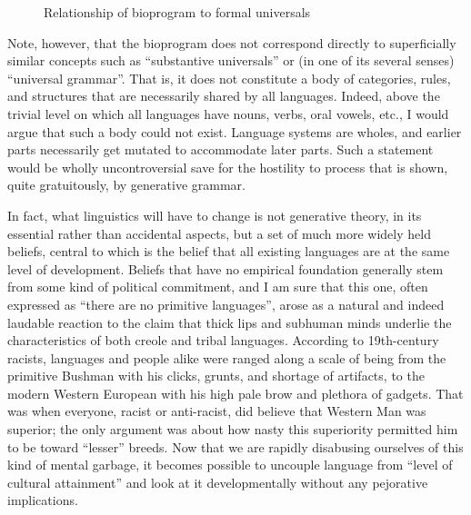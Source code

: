 \begin{figure}
	\begin{center}
	\end{center}
	\caption{Relationship of bioprogram to formal universals}\label{fig:5.1}
\end{figure}

Note, however, that the bioprogram does not correspond directly to superficially similar concepts such as ``substantive universals'' or (in one of its several senses) ``universal grammar''. That is, it does not constitute a body of categories, rules, and structures that are necessarily shared by all languages. Indeed, above the trivial level on which all languages have nouns, verbs, oral vowels, etc., I would argue that such a body could not exist. Language systems are wholes, and earlier parts necessarily get mutated to accommodate later parts. Such a statement would be wholly uncontroversial save for the hostility to process that is shown, quite gratuitously, by generative grammar.

In fact, what linguistics will have to change is not generative theory, in its essential rather than accidental aspects, but a set of much more widely held beliefs, central to which is the belief that all existing languages are at the same level of development. Beliefs that have no empirical foundation generally stem from some kind of politi\-cal commitment, and I am sure that this one, often expressed as ``there are no primitive languages'', arose as a natural and indeed laudable reaction to the claim that thick lips and subhuman minds underlie the characteristics of both creole and tribal languages. According to 19th-century racists, languages and people alike were ranged along a scale of being from the primitive Bushman with his clicks, grunts, and shortage of artifacts, to the modern Western European with his high pale brow and plethora of gadgets. That was when everyone, racist or anti-racist, did believe that Western Man was superior; the only argument was about how nasty this superiority permitted him to be toward ``lesser'' breeds. Now that we are rapidly disabusing ourselves of this kind of mental garbage, it becomes possible to uncouple language from ``level of cultural attainment'' and look at it developmentally without any pejorative implications.

